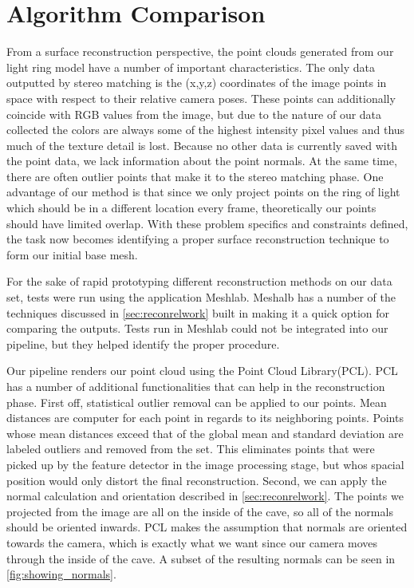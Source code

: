 \section{Algorithm Comparison}\label{sec:reconalgcomp}
From a surface reconstruction perspective, the point clouds generated from our light ring model have a number of important characteristics. The only data outputted by stereo matching is the (x,y,z) coordinates of the image points in space with respect to their relative camera poses. These points can additionally coincide with RGB values from the image, but due to the nature of our data collected the colors are always some of the highest intensity pixel values and thus much of the texture detail is lost. Because no other data is currently saved with the point data, we lack information about the point normals. At the same time, there are often outlier points that make it to the stereo matching phase. One advantage of our method is that since we only project points on the ring of light which should be in a different location every frame, theoretically our points should have limited overlap. With these problem specifics and constraints defined, the task now becomes identifying a proper surface reconstruction technique to form our initial base mesh.

For the sake of rapid prototyping different reconstruction methods on our data set, tests were run using the application Meshlab. Meshalb has a number of the techniques discussed in \ref{sec:reconrelwork} built in making it a quick option for comparing the outputs. Tests run in Meshlab could not be integrated into our pipeline, but they helped identify the proper procedure. 

Our pipeline renders our point cloud using the Point Cloud Library(PCL). PCL has a number of additional functionalities that can help in the reconstruction phase. First off, statistical outlier removal can be applied to our points. Mean distances are computer for each point in regards to its neighboring points. Points whose mean distances exceed that of the global mean and standard deviation are labeled outliers and removed from the set. This eliminates points that were picked up by the feature detector in  the image processing stage, but whos spacial position would only distort the final reconstruction. Second, we can apply the normal calculation and orientation described in \ref{sec:reconrelwork}. The points we projected from the image are all on the inside of the cave, so all of the normals should be oriented inwards. PCL makes the assumption that normals are oriented towards the camera, which is exactly what we want since our camera moves through the inside of the cave. A subset of the resulting normals can be seen in \ref{fig:showing_normals}.

